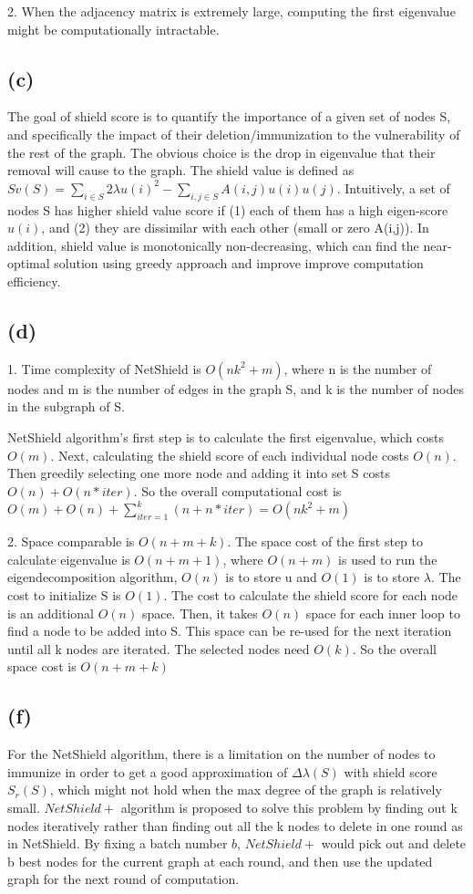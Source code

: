 \documentclass[]{article}
\begin{document}
2. When the adjacency matrix is extremely large, computing the first eigenvalue might be computationally intractable. 


\subsection*{(c)}
The goal of shield score is to quantify the importance of a given set of nodes S, and specifically the impact of their deletion/immunization to the vulnerability of the rest of the graph. The obvious choice is the drop in eigenvalue that their removal will cause to the graph.
The shield value is defined as $Sv(S)=\sum_{i\in S}2\lambda u(i)^2-\sum_{i,j\in S}A(i,j)u(i)u(j)$.
Intuitively, a set of nodes S has higher shield value score if (1) each of them has a high eigen-score $u(i)$,
and (2) they are dissimilar with each other (small or zero
A(i,j)).
In addition, shield value is monotonically non-decreasing, which can find the near-optimal solution using greedy approach and improve improve computation efficiency.

\subsection*{(d)}
1. Time complexity of NetShield is $O(nk^2+m)$, where n is the number of nodes and m is the number of edges in the graph S, and k is the number of nodes in the subgraph of S. 

NetShield algorithm's first step is to calculate the first eigenvalue, which costs $O(m)$. Next, calculating the shield score of each individual node costs $O(n)$.
Then greedily selecting one more node and adding it into set S costs $O(n)+O(n*iter)$. So the overall computational cost is $O(m)+O(n)+\sum_{iter=1}^k(n+n*iter)=O(nk^2+m)$

2. Space comparable is $O(n+m+k)$. The space cost of the first step to calculate eigenvalue is $O(n+m+1)$, where $O(n+m)$ is used to run the eigendecomposition algorithm, $O(n)$ is to store u and $O(1)$ is to store $\lambda$. 
The cost to initialize S is $O(1)$. The cost to calculate the shield score for each node is an additional $O(n)$ space. Then, it takes $O(n)$ space for each inner loop to find a node to be added into S. This space can be re-used for the next iteration until all k nodes are iterated. The selected nodes need $O(k)$. So the overall space cost is $O(n+m+k)$

\subsection*{(f)}
For the NetShield algorithm, there is a limitation on the number of nodes to immunize in order to get a good approximation of $\Delta\lambda(S)$ with shield score $S_r(S)$, which might not hold when the max degree of the graph is relatively small.
$NetShield+$ algorithm is proposed to solve this problem by finding out k nodes iteratively rather than finding out all the k nodes to delete in one round as in
NetShield. By fixing a batch number $b$, $NetShield+$ would pick out and delete b best nodes for the current graph at each round, and then use the updated graph for the next round of computation. 
\end{document}
